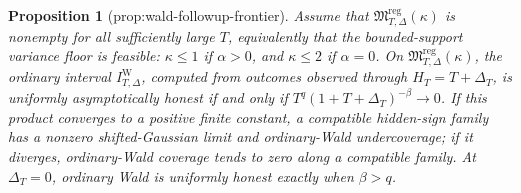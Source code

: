 \documentclass{article}
\newtheorem{proposition}{Proposition}
\begin{document}
\begin{proposition}[prop:wald-followup-frontier]\label{prop:wald-followup-frontier}
Assume that \(\mathfrak M_{T,\Delta}^{\mathrm{reg}}(\kappa)\) is nonempty for all sufficiently large \(T\), equivalently that the bounded-support variance floor is feasible: \(\kappa\leq1\) if \(\alpha>0\), and \(\kappa\leq2\) if \(\alpha=0\). On \(\mathfrak M_{T,\Delta}^{\mathrm{reg}}(\kappa)\), the ordinary interval \(I_{T,\Delta}^{\mathrm W}\), computed from outcomes observed through \(H_T=T+\Delta_T\), is uniformly asymptotically honest if and only if \(T^q(1+T+\Delta_T)^{-\beta}\to0\). If this product converges to a positive finite constant, a compatible hidden-sign family has a nonzero shifted-Gaussian limit and ordinary-Wald undercoverage; if it diverges, ordinary-Wald coverage tends to zero along a compatible family. At \(\Delta_T=0\), ordinary Wald is uniformly honest exactly when \(\beta>q\).
\end{proposition}
\end{document}
